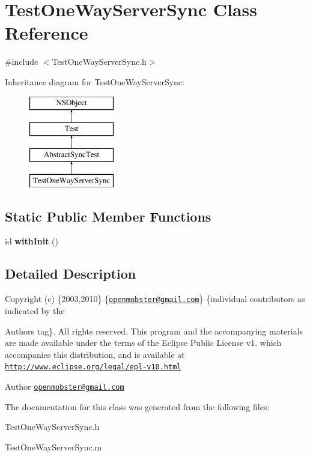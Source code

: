 \hypertarget{interface_test_one_way_server_sync}{
\section{\-Test\-One\-Way\-Server\-Sync \-Class \-Reference}
\label{interface_test_one_way_server_sync}
}


{\ttfamily \#include $<$\-Test\-One\-Way\-Server\-Sync.\-h$>$}

\-Inheritance diagram for \-Test\-One\-Way\-Server\-Sync\-:\begin{figure}[H]
\begin{center}
\leavevmode
\includegraphics[height=4.000000cm]{interface_test_one_way_server_sync}
\end{center}
\end{figure}
\subsection*{\-Static \-Public \-Member \-Functions}
\begin{DoxyCompactItemize}
\item 
\hypertarget{interface_test_one_way_server_sync_a2b470ed930d1ce40fc6ca00d83ede513}{
id {\bfseries with\-Init} ()}
\label{interface_test_one_way_server_sync_a2b470ed930d1ce40fc6ca00d83ede513}

\end{DoxyCompactItemize}


\subsection{\-Detailed \-Description}
\-Copyright (c) \{2003,2010\} \{\href{mailto:openmobster@gmail.com}{\tt openmobster@gmail.\-com}\} \{individual contributors as indicated by the \begin{DoxyAuthor}{\-Authors}
tag\}. \-All rights reserved. \-This program and the accompanying materials are made available under the terms of the \-Eclipse \-Public \-License v1. which accompanies this distribution, and is available at \href{http://www.eclipse.org/legal/epl-v10.html}{\tt http\-://www.\-eclipse.\-org/legal/epl-\/v10.\-html}
\end{DoxyAuthor}
\begin{DoxyAuthor}{\-Author}
\href{mailto:openmobster@gmail.com}{\tt openmobster@gmail.\-com} 
\end{DoxyAuthor}


\-The documentation for this class was generated from the following files\-:\begin{DoxyCompactItemize}
\item 
\-Test\-One\-Way\-Server\-Sync.\-h\item 
\-Test\-One\-Way\-Server\-Sync.\-m\end{DoxyCompactItemize}
